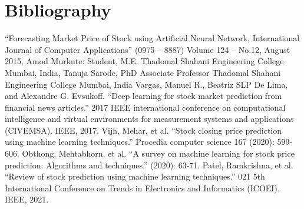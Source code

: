 \documentclass[conference]{IEEEtran}
\begin{document}
\section*{Bibliography}

\begin{thebibliography}{00}
``Forecasting Market Price of Stock using Artificial Neural Network, International Journal of Computer Applications''  (0975 – 8887) Volume 124 – No.12, August 2015, Amod Murkute: Student, M.E. Thadomal Shahani Engineering College Mumbai, India, Tanuja Sarode, PhD Associate Professor Thadomal Shahani Engineering College Mumbai, India
 Vargas, Manuel R., Beatriz SLP De Lima, and Alexandre G. Evsukoff.  ``Deep learning for stock market prediction from financial news articles.'' 2017 IEEE international conference on computational intelligence and virtual environments for measurement systems and applications (CIVEMSA). IEEE, 2017.
 Vijh, Mehar, et al. ``Stock closing price prediction using machine learning techniques.'' Procedia computer science 167 (2020): 599-606.
 Obthong, Mehtabhorn, et al.  ``A survey on machine learning for stock price prediction: Algorithms and techniques.'' (2020): 63-71.
 Patel, Ramkrishna, et al. ``Review of stock prediction using machine learning techniques.'' 021 5th International Conference on Trends in Electronics and Informatics (ICOEI). IEEE, 2021.
\end{thebibliography}
\vspace{12pt}
\end{document}
